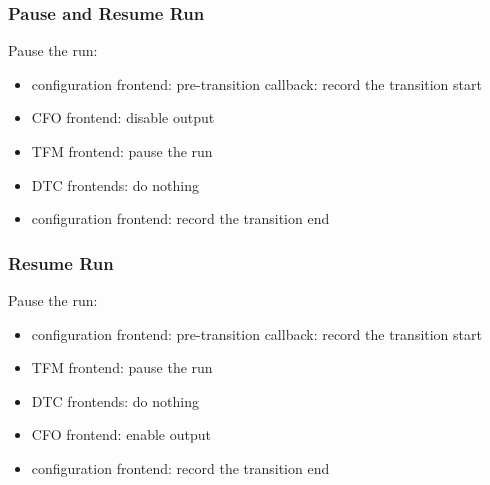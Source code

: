 \subsubsection{Pause and Resume Run}

Pause the run:

\begin{itemize}
\item
  configuration frontend: pre-transition callback: record the transition start
\item
  CFO frontend: disable output 
\item
  TFM frontend: pause the run
\item
  DTC frontends: do nothing 
\item
  configuration frontend: record the transition end
\end{itemize}

\subsubsection{Resume Run}

Pause the run:

\begin{itemize}
\item
  configuration frontend: pre-transition callback: record the transition start
\item
  TFM frontend: pause the run
\item
  DTC frontends: do nothing 
\item
  CFO frontend: enable output 
\item
  configuration frontend: record the transition end
\end{itemize}


